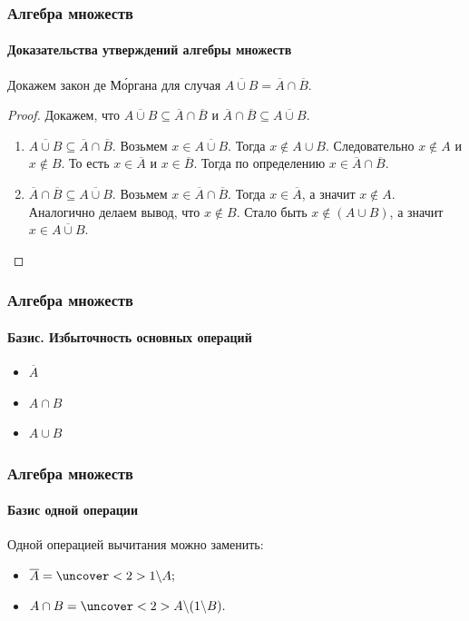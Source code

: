 \begin{frame}
    \frametitle{Алгебра множеств}
    \framesubtitle{Доказательства утверждений алгебры множеств}
    
    \begin{example} 
        Докажем закон де М\'{о}ргана для случая $\overline{A\cup B}=\overline{A}\cap\overline{B}$. 
    \end{example}
    \begin{proof}
        Докажем, что $\overline{A\cup B}\subseteq\overline{A}\cap\overline{B}$ и $\overline{A}\cap\overline{B}\subseteq\overline{A\cup B}$.
        \begin{enumerate}
            \item $\overline{A\cup B}\subseteq\overline{A}\cap\overline{B}$. Возьмем $x\in \overline{A\cup B}$. Тогда $x\not\in A\cup B$. Следовательно $x\not\in A$ и $x\not\in B$. То есть $x\in\overline{A}$ и $x\in\overline{B}$. Тогда по определению $x\in\overline{A}\cap\overline{B}$.
            \item $\overline{A}\cap\overline{B}\subseteq\overline{A\cup B}$. Возьмем $x\in\overline{A}\cap\overline{B}$. Тогда $x\in\overline{A}$, а значит $x\not\in A$. Аналогично делаем вывод, что $x\not\in B$. Стало быть $x\not\in(A\cup B)$, а значит $x\in\overline{A\cup B}$.
        \end{enumerate}
    \end{proof}
\end{frame}

\begin{frame}
    \frametitle{Алгебра множеств}
    \framesubtitle{Базис. Избыточность основных операций}
    
    \begin{itemize}
        \item $\overline{A}$
        \item $A\cap B$
        \item<1> $A\cup B$
    \end{itemize}
    
\end{frame}

\begin{frame}
    \frametitle{Алгебра множеств}
    \framesubtitle{Базис одной операции}
    
    Одной операцией вычитания можно заменить:
    \begin{itemize}
        \item $\overline{A}=\uncover<2>{1\backslash A;}$
        \item $A\cap B=\uncover<2>{A\backslash (1\backslash B).}$
    \end{itemize}
\end{frame}


